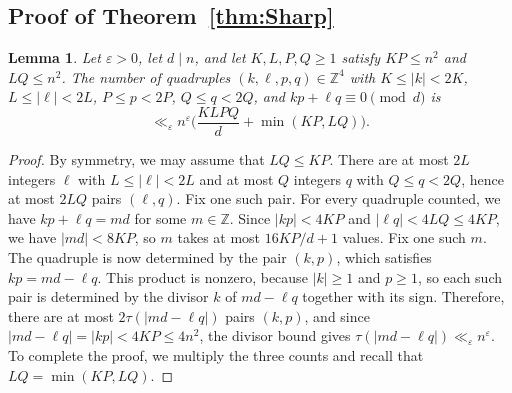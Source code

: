 \documentclass[12pt]{amsart}
\newtheorem{lemma}[theorem]{Lemma}
\theoremstyle{definition}
\newcommand{\Z}{\mathbb{Z}}
\begin{document}
\subsection{Proof of Theorem~\ref{thm:Sharp}}

\begin{lemma}
\label{lem:quadcount}
Let $\varepsilon>0$, let $d\mid n$, and let $K,L,P,Q\ge1$ satisfy $KP\le n^2$ and $LQ\le n^2$.  The number of quadruples $(k,\ell,p,q)\in\Z^4$ with $K\le|k|<2K$, $L\le|\ell|<2L$, $P\le p<2P$, $Q\le q<2Q$, and $kp+\ell q\equiv0\pmod d$ is
\[
\ll_{\varepsilon}n^{\varepsilon}\Big(\frac{KLPQ}{d}+\min(KP,LQ)\Big).
\]
\end{lemma}

\begin{proof}
By symmetry, we may assume that $LQ\le KP$.  There are at most $2L$ integers $\ell$ with $L\le|\ell|<2L$ and at most $Q$ integers $q$ with $Q\le q<2Q$, hence at most $2LQ$ pairs $(\ell,q)$.  Fix one such pair.  For every quadruple counted, we have $kp+\ell q=md$ for some $m\in\Z$.  Since $|kp|<4KP$ and $|\ell q|<4LQ\le4KP$, we have $|md|<8KP$, so $m$ takes at most $16KP/d+1$ values.  Fix one such $m$.  The quadruple is now determined by the pair $(k,p)$, which satisfies $kp=md-\ell q$.  This product is nonzero, because $|k|\ge1$ and $p\ge1$, so each such pair is determined by the divisor $k$ of $md-\ell q$ together with its sign.  Therefore, there are at most $2\tau(|md-\ell q|)$ pairs $(k,p)$, and since $|md-\ell q|=|kp|<4KP\le4n^2$, the divisor bound gives $\tau(|md-\ell q|)\ll_{\varepsilon}n^{\varepsilon}$.  To complete the proof, we multiply the three counts and recall that $LQ=\min(KP,LQ)$.
\end{proof}
\end{document}
